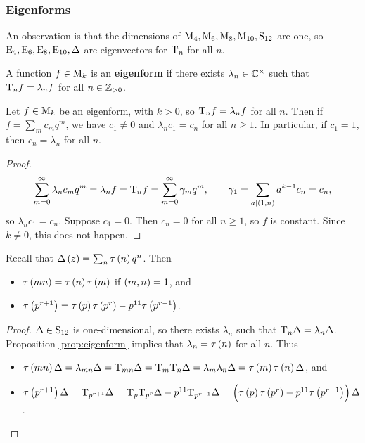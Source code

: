 \pagebreak

\subsubsection{Eigenforms}

An observation is that the dimensions of $ \M_4, \M_6, \M_8, \M_{10}, \S_{12} $ are one, so $ \E_4, \E_6, \E_8, \E_{10}, \Delta $ are eigenvectors for $ \T_n $ for all $ n $.

\begin{definition}
A function $ f \in \M_k $ is an \textbf{eigenform} if there exists $ \lambda_n \in \CC^\times $ such that $ \T_nf = \lambda_nf $ for all $ n \in \ZZ_{> 0} $.
\end{definition}


\begin{proposition}
\label{prop:eigenform}
Let $ f \in \M_k $ be an eigenform, with $ k > 0 $, so $ \T_nf = \lambda_nf $ for all $ n $. Then if $ f = \sum_m c_mq^m $, we have $ c_1 \ne 0 $ and $ \lambda_nc_1 = c_n $ for all $ n \ge 1 $. In particular, if $ c_1 = 1 $, then $ c_n = \lambda_n $ for all $ n $.
\end{proposition}

\begin{proof}
$$ \sum_{m = 0}^\infty \lambda_nc_mq^m = \lambda_nf = \T_nf = \sum_{m = 0}^\infty \gamma_mq^m, \qquad \gamma_1 = \sum_{a \mid \br{1, n}} a^{k - 1}c_n = c_n, $$
so $ \lambda_nc_1 = c_n $. Suppose $ c_1 = 0 $. Then $ c_n = 0 $ for all $ n \ge 1 $, so $ f $ is constant. Since $ k \ne 0 $, this does not happen.
\end{proof}

\begin{corollary}
Recall that $ \Delta\br{z} = \sum_n \tau\br{n}q^n $. Then
\begin{itemize}
\item $ \tau\br{mn} = \tau\br{n}\tau\br{m} $ if $ \br{m, n} = 1 $, and
\item $ \tau\br{p^{r + 1}} = \tau\br{p}\tau\br{p^r} - p^{11}\tau\br{p^{r - 1}} $.
\end{itemize}
\end{corollary}

\begin{proof}
$ \Delta \in \S_{12} $ is one-dimensional, so there exists $ \lambda_n $ such that $ \T_n\Delta = \lambda_n\Delta $. Proposition \ref{prop:eigenform} implies that $ \lambda_n = \tau\br{n} $ for all $ n $. Thus
\begin{itemize}
\item $ \tau\br{mn}\Delta = \lambda_{mn}\Delta = \T_{mn}\Delta = \T_m\T_n\Delta = \lambda_m\lambda_n\Delta = \tau\br{m}\tau\br{n}\Delta $, and
\item $ \tau\br{p^{r + 1}}\Delta = \T_{p^{r + 1}}\Delta = \T_p\T_{p^r}\Delta - p^{11}\T_{p^{r - 1}}\Delta = \br{\tau\br{p}\tau\br{p^r} - p^{11}\tau\br{p^{r - 1}}}\Delta $.
\end{itemize}
\end{proof}

